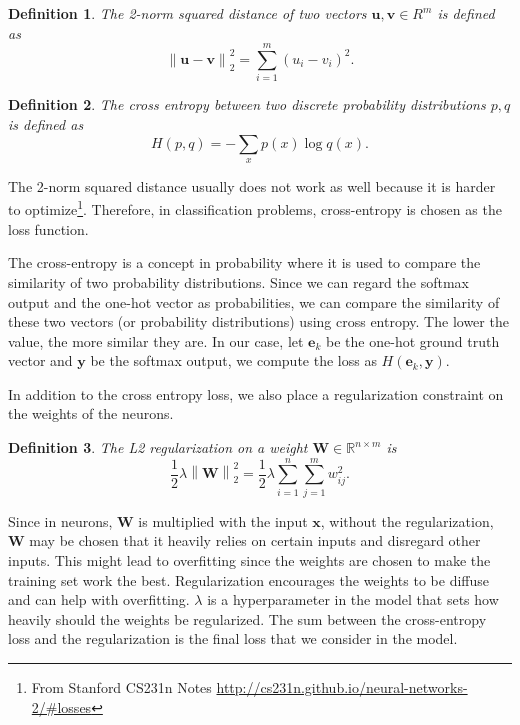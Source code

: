 \documentclass[12pt]{article}
\newtheorem{definition}{Definition}
\theoremstyle{remark}
\newcommand{\R}{\mathbb{R}}
\newcommand{\mat}[1]{\mathbf{#1}}
\newcommand{\norm}[1]{\left\lVert#1\right\rVert}
\begin{document}
\begin{definition}
	The 2-norm squared distance of two vectors \(\mat u, \mat v \in R^m\) is defined as
	\[
		\norm{\mat u - \mat v}_2^2 = \sum_{i=1}^m (u_i - v_i)^2.
	\]
\end{definition}

\begin{definition}
	The cross entropy between two discrete probability distributions \(p, q\) is defined as
	\[
		H(p, q) = - \sum_{x} p(x) \log q(x).
	\]
\end{definition}

The 2-norm squared distance usually does not work as well because it is harder to optimize\footnote{From Stanford CS231n Notes \url{http://cs231n.github.io/neural-networks-2/#losses}}. Therefore, in classification problems, cross-entropy is chosen as the loss function.

The cross-entropy is a concept in probability where it is used to compare the similarity of two probability distributions. Since we can regard the softmax output and the one-hot vector as probabilities, we can compare the similarity of these two vectors (or probability distributions) using cross entropy. The lower the value, the more similar they are. In our case, let \(\mat e_k\) be the one-hot ground truth vector and \(\mat y\) be the softmax output, we compute the loss as \(H(\mat e_k, \mat y)\).

In addition to the cross entropy loss, we also place a regularization constraint on the weights of the neurons.
\begin{definition}
	The L2 regularization on a weight \(\mat W \in \R^{n \times m}\) is
	\[
		\frac{1}{2}{\lambda}\norm{\mat W}_2^2	= \frac{1}{2}\lambda\sum_{i=1}^n \sum_{j=1}^m w_{ij}^2.
	\]
\end{definition}
Since in neurons, \(\mat W\) is multiplied with the input \(\mat x\), without the regularization, \(\mat W\) may be chosen that it heavily relies on certain inputs and disregard other inputs. This might lead to overfitting since the weights are chosen to make the training set work the best. Regularization encourages the weights to be diffuse and can help with overfitting. \(\lambda\) is a hyperparameter in the model that sets how heavily should the weights be regularized. The sum between the cross-entropy loss and the regularization is the final loss that we consider in the model.
\end{document}
